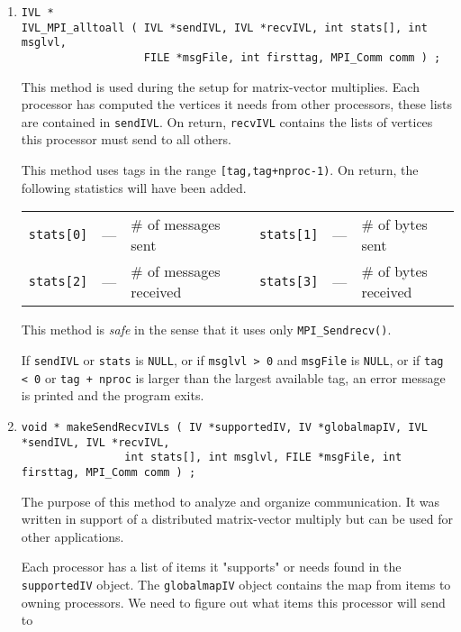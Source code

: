 \begin{enumerate}
\item
\begin{verbatim}
IVL *
IVL_MPI_alltoall ( IVL *sendIVL, IVL *recvIVL, int stats[], int msglvl,
                   FILE *msgFile, int firsttag, MPI_Comm comm ) ;
\end{verbatim}
This method is used during the setup for matrix-vector multiplies.
Each processor has computed the vertices it needs from other
processors, these lists are contained in {\tt sendIVL}. 
On return, {\tt recvIVL} contains the lists of vertices this processor 
must send to all others.
\par
This method uses tags in the range {\tt [tag,tag+nproc-1)}.
On return, the following statistics will have been added.
\begin{center}
\begin{tabular}{cclcccl}
{\tt stats[0]} & --- & \# of messages sent 
& &
{\tt stats[1]} & --- & \# of bytes sent \\
{\tt stats[2]} & --- & \# of messages received 
& &
{\tt stats[3]} & --- & \# of bytes received 
\end{tabular}
\end{center}
This method is {\it safe} in the sense that it uses only
{\tt MPI\_Sendrecv()}.
\par {}
If {\tt sendIVL}
or {\tt stats} is {\tt NULL}, 
or if {\tt msglvl > 0} and {\tt msgFile} is {\tt NULL},
or if {\tt tag < 0} or {\tt tag + nproc} 
is larger than the largest available tag,
an error message is printed and the program exits.
\item
\begin{verbatim}
void * makeSendRecvIVLs ( IV *supportedIV, IV *globalmapIV, IVL *sendIVL, IVL *recvIVL, 
                int stats[], int msglvl, FILE *msgFile, int firsttag, MPI_Comm comm ) ;
\end{verbatim}
\par
The purpose of this method to analyze and organize communication. 
It was written in support of a distributed matrix-vector multiply 
but can be used for other applications.
\par 
Each processor has a list of items it "supports" or needs found
in the {\tt supportedIV} object. 
The {\tt globalmapIV} object contains the
map from items to owning processors. 
We need to figure out what items this processor will send to 

\end{enumerate}
